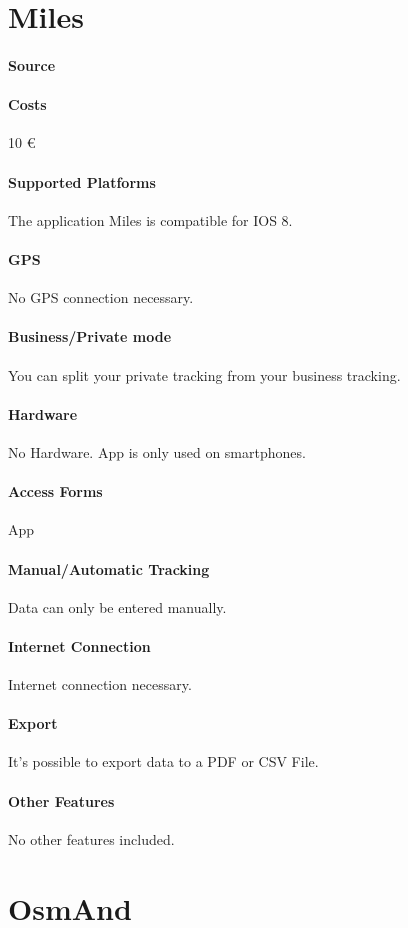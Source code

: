 \section{Miles}
\paragraph{Source} 
\paragraph{Costs} 10 \euro
\paragraph{Supported Platforms} The application Miles is compatible for IOS 8.
\paragraph{GPS} No GPS connection necessary.
\paragraph{Business/Private mode} You can split your private tracking from your business tracking.
\paragraph{Hardware} No Hardware. App is only used on smartphones.
\paragraph{Access Forms} App
\paragraph{Manual/Automatic Tracking} Data can only be entered manually.
\paragraph{Internet Connection} Internet connection necessary.
\paragraph{Export} It’s possible to export data to a PDF or CSV File.
\paragraph{Other Features} No other features included.
\newpage
\section{OsmAnd}
